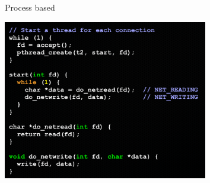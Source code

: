 \begin{frame}{Process based}
  \begin{center}
    \includegraphics[height=7cm,keepaspectratio]{sources/images/process-based.png}
  \end{center}
\end{frame}